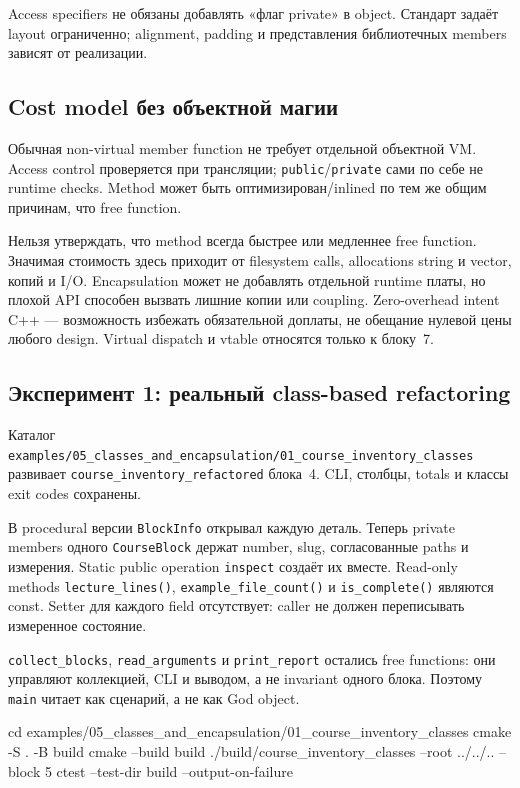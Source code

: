 Access specifiers не обязаны добавлять «флаг private» в object. Стандарт
задаёт layout ограниченно; alignment, padding и представления библиотечных
members зависят от реализации.

\subsection{Cost model без объектной магии}

Обычная non-virtual member function не требует отдельной объектной VM. Access
control проверяется при трансляции; \texttt{public}/\texttt{private} сами по
себе не runtime checks. Method может быть оптимизирован/inlined по тем же
общим причинам, что free function.

Нельзя утверждать, что method всегда быстрее или медленнее free function.
Значимая стоимость здесь приходит от filesystem calls, allocations string и
vector, копий и I/O. Encapsulation может не добавлять отдельной runtime платы,
но плохой API способен вызвать лишние копии или coupling. Zero-overhead intent
C++ --- возможность избежать обязательной доплаты, не обещание нулевой цены
любого design. Virtual dispatch и vtable относятся только к блоку~7.

\subsection{Эксперимент 1: реальный class-based refactoring}

Каталог
\texttt{examples/05\_classes\_and\_encapsulation/01\_course\_inventory\_classes}
развивает \texttt{course\_inventory\_refactored} блока~4. CLI, столбцы,
totals и классы exit codes сохранены.

В procedural версии \texttt{BlockInfo} открывал каждую деталь. Теперь private
members одного \texttt{CourseBlock} держат number, slug, согласованные paths
и измерения. Static public operation \texttt{inspect} создаёт их вместе.
Read-only methods \texttt{lecture\_lines()},
\texttt{example\_file\_count()} и \texttt{is\_complete()} являются const.
Setter для каждого field отсутствует: caller не должен переписывать измеренное
состояние.

\texttt{collect\_blocks}, \texttt{read\_arguments} и
\texttt{print\_report} остались free functions: они управляют коллекцией, CLI
и выводом, а не invariant одного блока. Поэтому \texttt{main} читает как
сценарий, а не как God object.

\begin{shellcode}
cd examples/05_classes_and_encapsulation/01_course_inventory_classes
cmake -S . -B build
cmake --build build
./build/course_inventory_classes --root ../../.. --block 5
ctest --test-dir build --output-on-failure
\end{shellcode}

